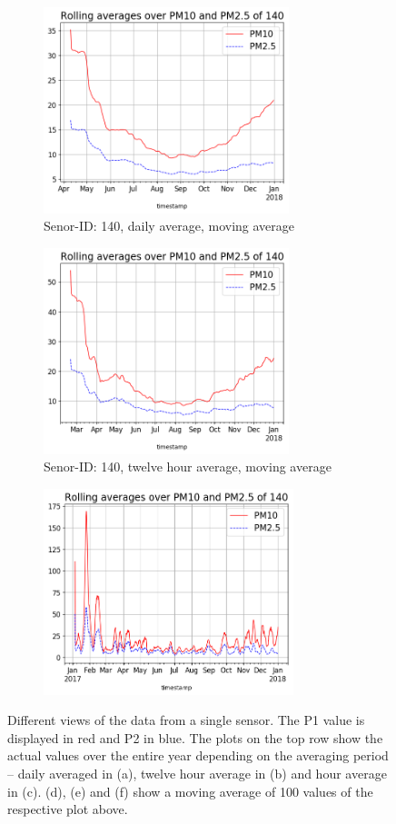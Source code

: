 \documentclass[12pt,a4paper,twoside]{scrartcl}
\numberwithin{equation}{section}
\begin{document}
\begin{figure}[H]
  \begin{subfigure}[t]{0.32\textwidth}
    \includegraphics[width=\textwidth,height=6cm]{figures/plots_1d/140_rolling_plot_}%
    \caption{Senor-ID: 140, daily average, moving average}
  \end{subfigure}
  \begin{subfigure}[t]{0.32\textwidth}
    \includegraphics[width=\textwidth,height=6cm]{figures/plots_12h/140_rolling_plot_}%
    \caption{Senor-ID: 140, twelve hour average, moving average}
  \end{subfigure}
  \begin{subfigure}[t]{0.32\textwidth}
    \includegraphics[width=\textwidth,height=6cm]{figures/plots_1h/140_rolling_plot_}%
  \end{subfigure}      
  \caption[Sensor Data Plots]{Different views of the data from a single sensor. The P1 value is displayed in red and P2 in blue. The plots on the top row show the actual values over the entire year depending on the averaging period -- daily averaged in (a), twelve hour average in (b) and hour average in (c). (d), (e) and (f) show a moving average of 100 values of the respective plot above.}\label{fig:sensor-plots}
\end{figure}
\end{document}

